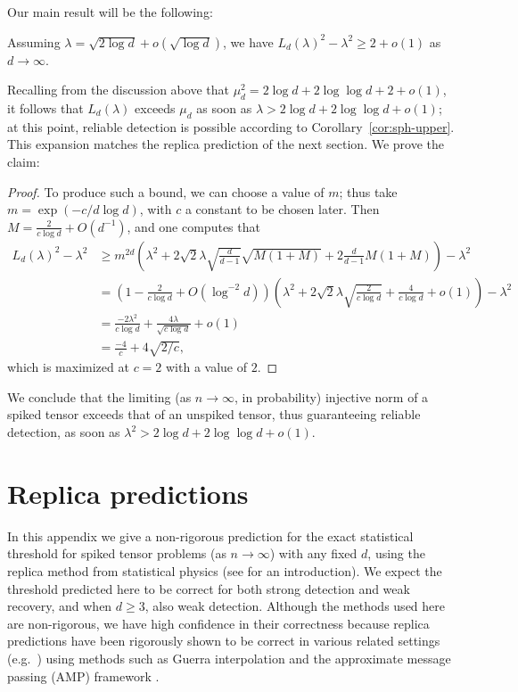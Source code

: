 \documentclass{article}
\begin{document}
Our main result will be the following:
\begin{claim}
Assuming $\lambda = \sqrt{2 \log d} + o(\sqrt{\log d})$, we have $L_d(\lambda)^2 - \lambda^2 \geq 2 + o(1)$ as $d \to \infty$.
\end{claim}
\noindent Recalling from the discussion above that $\mu_d^2 = 2 \log d + 2 \log \log d + 2 + o(1)$, it follows that $L_d(\lambda)$ exceeds $\mu_d$ as soon as $\lambda > 2 \log d + 2 \log \log d + o(1)$; at this point, reliable detection is possible according to Corollary~\ref{cor:sph-upper}. This expansion matches the replica prediction of the next section. We prove the claim:
\begin{proof}
To produce such a bound, we can choose a value of $m$; thus take $m = \exp(-c/d\log d)$, with $c$ a constant to be chosen later. Then $M = \frac{2}{c \log d} + O(d^{-1})$, and one computes that
\begin{align*}
    L_d(\lambda)^2 - \lambda^2 &\geq m^{2d} \left( \lambda^2 + 2 \sqrt{2} \lambda \sqrt{\frac{d}{d-1}} \sqrt{M(1+M)} + 2 \frac{d}{d-1} M(1+M) \right) - \lambda^2 \\
    &= \left( 1 - \frac{2}{c \log d}  + O(\log^{-2} d) \right) \left(\lambda^2 + 2 \sqrt{2} \lambda \sqrt{\frac{2}{c \log d}} + \frac{4}{c \log d} + o(1) \right) - \lambda^2 \\
    &= \frac{-2\lambda^2}{c \log d} + \frac{4\lambda}{\sqrt{c \log d}} + o(1) \\
    &= \frac{-4}{c} + 4 \sqrt{2/c},
\end{align*}
which is maximized at $c=2$ with a value of $2$.
\end{proof}
\noindent We conclude that the limiting (as $n \to \infty$, in probability) injective norm of a spiked tensor exceeds that of an unspiked tensor, thus guaranteeing reliable detection, as soon as $\lambda^2 > 2 \log d + 2 \log \log d + o(1)$.






\section{Replica predictions}\label{app:replica}


In this appendix we give a non-rigorous prediction for the exact statistical threshold for spiked tensor problems (as $n \to \infty$) with any fixed $d$, using the replica method from statistical physics (see \cite{mm-book} for an introduction). We expect the threshold predicted here to be correct for both strong detection and weak recovery, and when $d \ge 3$, also weak detection. Although the methods used here are non-rigorous, we have high confidence in their correctness because replica predictions have been rigorously shown to be correct in various related settings (e.g.\ \cite{tal06parisi,tal06,mi,mi-proof,lelarge-limits-lowrank}) using methods such as Guerra interpolation \cite{guerra} and the approximate message passing (AMP) framework \cite{amp-cs,amp-mot,bm,jm}.
\end{document}
